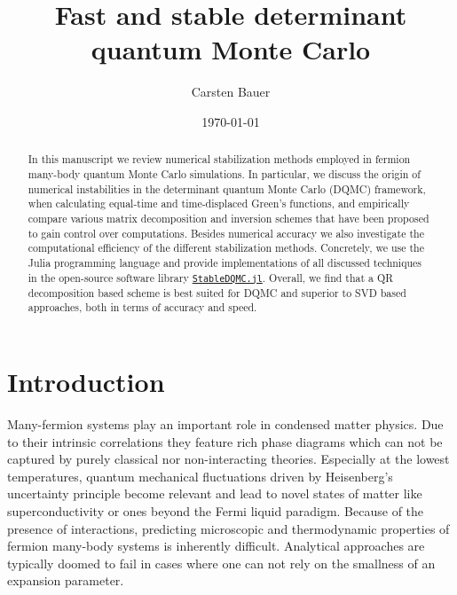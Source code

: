 \documentclass[%
 reprint,
superscriptaddress,
citeautoscript,
showpacs,
 amsmath,amssymb,
 aps,
 prb,
longbibliography,
]{revtex4-2}
\begin{document}
\title{Fast and stable determinant quantum Monte Carlo}%

\author{Carsten Bauer}

\date{\today}%

\begin{abstract}
In this manuscript we review numerical stabilization methods employed in fermion many-body quantum Monte Carlo simulations. In particular, we discuss the origin of numerical instabilities in the determinant quantum Monte Carlo (DQMC) framework, when calculating equal-time and time-displaced Green's functions, and empirically compare various matrix decomposition and inversion schemes that have been proposed to gain control over computations. Besides numerical accuracy we also investigate the computational efficiency of the different stabilization methods. Concretely, we use the Julia programming language and provide implementations of all discussed techniques in the open-source software library \href{http://github.com/crstnbr/StableDQMC.jl}{\texttt{StableDQMC.jl}}. Overall, we find that a QR decomposition based scheme is best suited for DQMC and superior to SVD based approaches, both in terms of accuracy and speed.
\end{abstract}


\maketitle


\section{Introduction}


Many-fermion systems play an important role in condensed matter physics. Due to their intrinsic correlations they feature rich phase diagrams which can not be captured by purely classical nor non-interacting theories. Especially at the lowest temperatures, quantum mechanical fluctuations driven by Heisenberg's uncertainty principle become relevant and lead to novel states of matter like superconductivity or ones beyond the Fermi liquid paradigm. Because of the presence of interactions, predicting microscopic and thermodynamic properties of fermion many-body systems is inherently difficult. Analytical approaches are typically doomed to fail in cases where one can not rely on the smallness of an expansion parameter.
\end{document}
